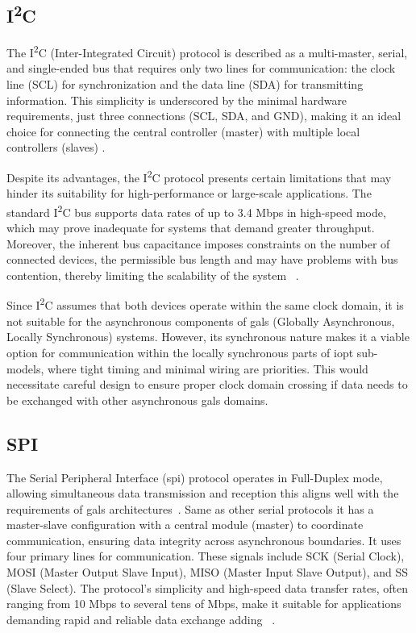 \subsection{I\textsuperscript{2}C}
\label{subsub:i2c}

The I\textsuperscript{2}C  (Inter-Integrated Circuit) protocol is described as a multi-master, serial, and single-ended bus that requires only two lines for communication: the clock line (SCL) for synchronization and the data line (SDA) for transmitting information. This simplicity is underscored by the minimal hardware requirements, just three connections (SCL, SDA, and GND), making it an ideal choice for connecting the central controller (master) with multiple local controllers (slaves) \cite{i2c}.

Despite its advantages, the I\textsuperscript{2}C  protocol presents certain limitations that may hinder its suitability for high-performance or large-scale applications. The standard I\textsuperscript{2}C bus supports data rates of up to 3.4 Mbps in high-speed mode, which may prove inadequate for systems that demand greater throughput. Moreover, the inherent bus capacitance imposes constraints on the number of connected devices, the permissible bus length and may have problems with bus contention, thereby limiting the scalability of the system ~\cite{I2Cv2}.

Since I\textsuperscript{2}C assumes that both devices operate within the same clock domain, it is not suitable for the asynchronous components of \gls{gals} (Globally Asynchronous, Locally Synchronous) systems. However, its synchronous nature makes it a viable option for communication within the locally synchronous parts of \gls{iopt} sub-models, where tight timing and minimal wiring are priorities. This would necessitate careful design to ensure proper clock domain crossing if data needs to be exchanged with other asynchronous \gls{gals} domains.

\subsection{SPI}
\label{subsub:spi}

The Serial Peripheral Interface (\gls{spi}) protocol operates in Full-Duplex mode, allowing simultaneous data transmission and reception this aligns well with the requirements of \gls{gals} architectures~\cite{spisite}. Same as other serial protocols it has a master-slave configuration with a central module (master) to coordinate communication, ensuring data integrity across asynchronous boundaries. It uses four primary lines for communication. These signals include SCK (Serial Clock), MOSI (Master Output Slave Input), MISO (Master Input Slave Output), and SS (Slave Select). The protocol's simplicity and high-speed data transfer rates, often ranging from 10 Mbps to several tens of Mbps, make it suitable for applications demanding rapid and reliable data exchange adding ~\cite{spisite}.

